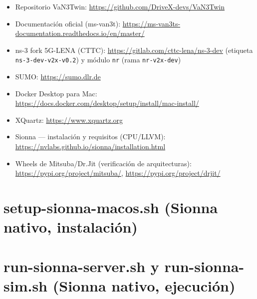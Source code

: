 \documentclass[11pt,a4paper]{article}
\begin{document}
\begin{itemize}
  \item Repositorio VaN3Twin: \url{https://github.com/DriveX-devs/VaN3Twin}
  \item Documentaci\'on oficial (ms-van3t):
        \url{https://ms-van3ts-documentation.readthedocs.io/en/master/}
  \item ns-3 fork 5G-LENA (CTTC): \url{https://gitlab.com/cttc-lena/ns-3-dev}
        (etiqueta \texttt{ns-3-dev-v2x-v0.2}) y m\'odulo \texttt{nr}
        (rama \texttt{nr-v2x-dev})
  \item SUMO: \url{https://sumo.dlr.de}
  \item Docker Desktop para Mac:
        \url{https://docs.docker.com/desktop/setup/install/mac-install/}
  \item XQuartz: \url{https://www.xquartz.org}
  \item Sionna --- instalaci\'on y requisitos (CPU/LLVM):
        \url{https://nvlabs.github.io/sionna/installation.html}
  \item Wheels de Mitsuba/Dr.Jit (verificaci\'on de arquitecturas):
        \url{https://pypi.org/project/mitsuba/},
        \url{https://pypi.org/project/drjit/}
\end{itemize}

\clearpage
\appendix

\section{setup-sionna-macos.sh (Sionna nativo, instalaci\'on)}
\label{anexo:sionnasetup}



\clearpage

\section{run-sionna-server.sh y run-sionna-sim.sh (Sionna nativo, ejecuci\'on)}
\label{anexo:sionnasim}




\end{document}
